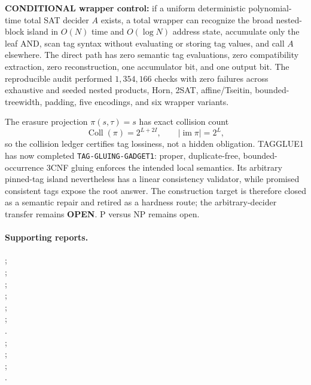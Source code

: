 \documentclass[11pt]{article}
\begin{document}
\textbf{CONDITIONAL wrapper control:} if a uniform deterministic
polynomial-time total SAT decider \(A\) exists, a total wrapper can recognize
the broad nested-block island in \(O(N)\) time and \(O(\log N)\) address state,
accumulate only the leaf AND, scan tag syntax without evaluating or storing tag
values, and call \(A\) elsewhere.  The direct path has zero semantic tag
evaluations, zero compatibility extraction, zero reconstruction, one
accumulator bit, and one output bit.  The reproducible audit performed
\(1{,}354{,}166\) checks with zero failures across exhaustive and seeded
nested products, Horn, 2SAT, affine/Tseitin, bounded-treewidth, padding,
five encodings, and six wrapper variants.

The erasure projection \(\pi(s,\tau)=s\) has exact collision count
\[
 \operatorname{Coll}(\pi)=2^{L+2I},\qquad |\operatorname{im}\pi|=2^L,
\]
so the collision ledger certifies tag lossiness, not a hidden obligation.
TAGGLUE1 has now completed \texttt{TAG-GLUING-GADGET1}: proper,
duplicate-free, bounded-occurrence 3CNF gluing enforces the intended local
semantics. Its arbitrary pinned-tag island nevertheless has a linear
consistency validator, while promised consistent tags expose the root answer.
The construction target is therefore closed as a semantic repair and retired
as a hardness route; the arbitrary-decider transfer remains \textbf{OPEN}.  P versus NP remains open.

\paragraph{Supporting reports.}
;\\
;\\
;\\
;\\
;\\
;\\
.\\
;\\
;\\
;\\
.
\end{document}

